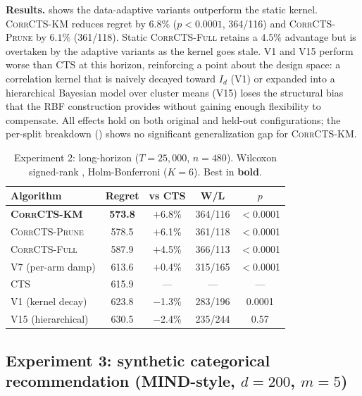 \documentclass{article}
\theoremstyle{plain}
\theoremstyle{definition}
\theoremstyle{remark}
\newcommand{\CorrFull}{\textsc{CorrCTS-Full}}
\newcommand{\EdgePrune}{\textsc{CorrCTS-Prune}}
\newcommand{\KMRefine}{\textsc{CorrCTS-KM}}
\begin{document}
\textbf{Results.}
 shows the data-adaptive variants outperform the static kernel.
\KMRefine{} reduces regret by $6.8\%$ ($p < 0.0001$, 364/116) and \EdgePrune{} by $6.1\%$ (361/118).
Static \CorrFull{} retains a $4.5\%$ advantage but is overtaken by the adaptive variants as the kernel goes stale.
V1 and V15 perform worse than CTS at this horizon, reinforcing a point about the design space: a correlation kernel that is naively decayed toward $I_d$ (V1) or expanded into a hierarchical Bayesian model over cluster means (V15) loses the structural bias that the RBF construction provides without gaining enough flexibility to compensate.
All effects hold on both original and held-out configurations; the per-split breakdown () shows no significant generalization gap for \KMRefine{}.

\begin{table}[t]
\caption{Experiment 2: long-horizon ($T{=}25{,}000$, $n{=}480$). Wilcoxon signed-rank \citep{wilcoxon1945individual}, Holm-Bonferroni \citep{holm1979simple} ($K{=}6$). Best in \textbf{bold}.}
\label{tab:tier7}
\centering
\small
\begin{tabular}{@{}lcccc@{}}
\toprule
Algorithm & Regret & vs CTS & W/L & $p$ \\
\midrule
\textbf{\KMRefine{}} & \textbf{573.8} & $+$6.8\% & 364/116 & ${<}$0.0001 \\
\EdgePrune{} & 578.5 & $+$6.1\% & 361/118 & ${<}$0.0001 \\
\CorrFull{} & 587.9 & $+$4.5\% & 366/113 & ${<}$0.0001 \\
V7 (per-arm damp) & 613.6 & $+$0.4\% & 315/165 & ${<}$0.0001 \\
CTS & 615.9 & --- & --- & --- \\
V1 (kernel decay) & 623.8 & $-$1.3\% & 283/196 & 0.0001 \\
V15 (hierarchical) & 630.5 & $-$2.4\% & 235/244 & 0.57 \\
\bottomrule
\end{tabular}
\end{table}

\subsection{Experiment 3: synthetic categorical recommendation (MIND-style, $d{=}200$, $m{=}5$)}\label{sec:exp3}
\end{document}
